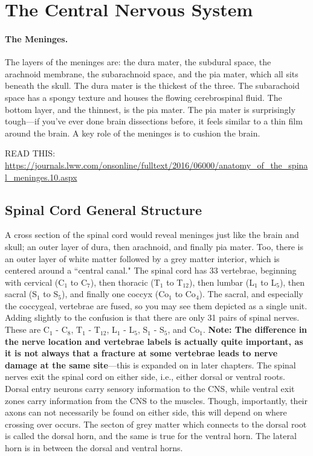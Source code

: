 \documentclass[12pt]{report}
\begin{document}
\chapter{The Central Nervous System}

\subsubsection{The Meninges.}

The layers of the meninges are: the dura mater, the subdural space, the arachnoid membrane, the subarachnoid space, and the pia mater, which all sits beneath the skull. The dura mater is the thickest of the three. The subarachoid space has a spongy texture and houses the flowing cerebrospinal fluid. The bottom layer, and the thinnest, is the pia mater. The pia mater is surprisingly tough---if you've ever done brain dissections before, it feels similar to a thin film around the brain. A key role of the meninges is to cushion the brain.\newline

READ THIS: \url{https://journals.lww.com/onsonline/fulltext/2016/06000/anatomy_of_the_spinal_meninges.10.aspx}

\section{Spinal Cord General Structure}
A cross section of the spinal cord would reveal meninges just like the brain and skull; an outer layer of dura, then arachnoid, and finally pia mater. Too, there is an outer layer of white matter followed by a grey matter interior, which is centered around a ``central canal." The spinal cord has 33 vertebrae, beginning with cervical (C$_1$ to C$_7$), then thoracic (T$_1$ to T$_{12}$), then lumbar (L$_1$ to L$_5$), then sacral (S$_1$ to S$_5$), and finally one coccyx (Co$_1$ to Co$_4$). The sacral, and especially the coccygeal, vertebrae are fused, so you may see them depicted as a single unit. Adding slightly to the confusion is that there are only 31 pairs of spinal nerves. These are C$_1$ - C$_8$, T$_1$ - T$_{12}$, L$_1$ - L$_5$, S$_1$ - S$_5$, and Co$_1$. \textbf{Note: The difference in the nerve location and vertebrae labels is actually quite important, as it is not always that a fracture at some vertebrae leads to nerve damage at the same site}---this is expanded on in later chapters. The spinal nerves exit the spinal cord on either side, i.e., either dorsal or ventral roots. Dorsal entry neurons carry sensory information to the CNS, while ventral exit zones carry information from the CNS to the muscles. Though, importantly, their axons can not necessarily be found on either side, this will depend on where crossing over occurs. The secton of grey matter which connects to the dorsal root is called the dorsal horn, and the same is true for the ventral horn. The lateral horn is in between the dorsal and ventral horns.\newline
\end{document}
